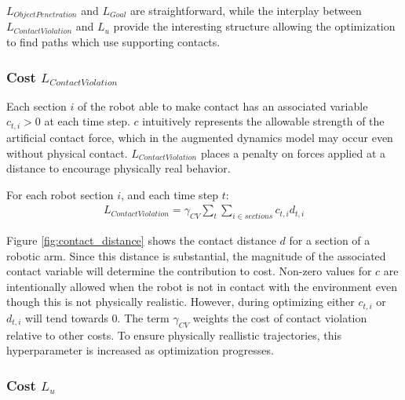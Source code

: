 \documentclass[../thesis.tex]{subfiles}
\begin{document}
$L_{Object Penetration}$ and $L_{Goal}$ are straightforward, while the interplay between $L_{Contact Violation}$ and $L_u$ provide the interesting structure allowing the optimization to find paths which use supporting contacts.




\subsubsection{Cost $L_{Contact Violation}$}
Each section $i$ of the robot able to make contact has an associated variable $c_{t,i} > 0$ at each time step. $c$ intuitively represents the allowable strength of the artificial contact force, which in the augmented dynamics model may occur even without physical contact.
$L_{Contact Violation}$ places a penalty on forces applied at a distance to encourage physically real behavior.

For each robot section $i$, and each time step $t$:
\begin{align}
  L_{Contact Violation} = \gamma_{CV} \sum_t{\sum_{i\in sections}{c_{t,i} d_{t,i}}}
\end{align}

Figure \ref{fig:contact_distance} shows the contact distance $d$ for a section of a robotic arm. Since this distance is substantial, the magnitude of the associated contact variable will determine the contribution to cost. 
Non-zero values for $c$ are intentionally allowed when the robot is not in contact with the environment even though this is not physically realistic.
However, during optimizing either $c_{t,i}$ or $d_{t,i}$ will tend towards 0.
The term $\gamma_{CV}$ weights the cost of contact violation relative to other costs.
To ensure physically reallistic trajectories, this hyperparameter is increased as optimization progresses.







\subsubsection{Cost $L_u$}
\end{document}
